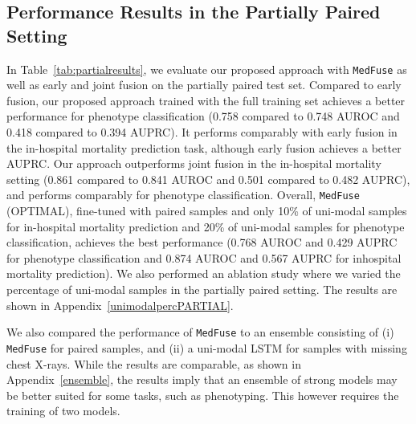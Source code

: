 \documentclass[pmlr]{jmlr}
\begin{document}
\subsection{Performance Results in the Partially Paired Setting} 
In Table~\ref{tab:partialresults}, we evaluate our proposed approach with \texttt{MedFuse} as well as early and joint fusion on the partially paired test set. Compared to early fusion, our proposed approach trained with the full  training set achieves a better performance for phenotype classification (0.758 compared to 0.748 AUROC and 0.418 compared to 0.394 AUPRC). It performs comparably with early fusion in the in-hospital mortality prediction task, although early fusion achieves a better AUPRC. Our approach outperforms joint fusion in the in-hospital mortality setting (0.861 compared to 0.841 AUROC and 0.501 compared to 0.482 AUPRC), and performs comparably for phenotype classification. Overall, \texttt{MedFuse} (OPTIMAL), fine-tuned with paired samples and only 10\% of uni-modal samples for in-hospital mortality prediction and 20\% of uni-modal samples for phenotype classification, achieves the best performance (0.768 AUROC and 0.429 AUPRC for phenotype classification and 0.874 AUROC and 0.567 AUPRC for inhospital mortality prediction). We also performed an ablation study where we varied the percentage of uni-modal samples in the partially paired setting. The results are shown in Appendix~\ref{unimodalpercPARTIAL}.


We also compared the performance of \texttt{MedFuse} to an ensemble consisting of (i) \texttt{MedFuse} for paired samples, and (ii) a uni-modal LSTM for samples with missing chest X-rays. While the results are comparable, as shown in Appendix~\ref{ensemble}, the results imply that an ensemble of strong models may be better suited for some tasks, such as phenotyping. This however requires the training of two models. 
\end{document}
